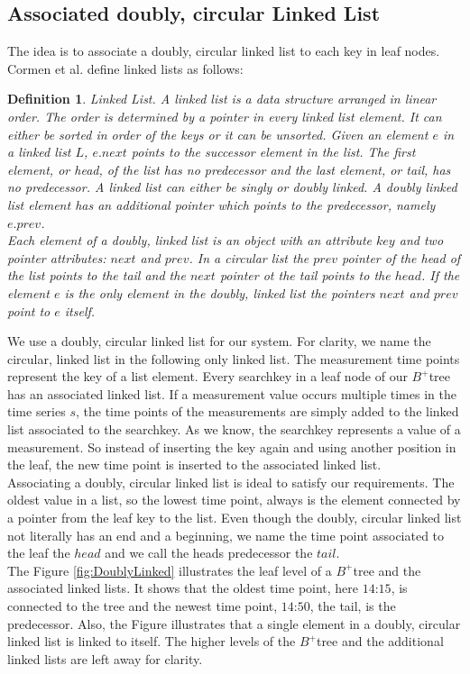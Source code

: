 \documentclass[abstracton,12pt]{scrreprt}
\newtheorem{definition}{Definition}
\begin{document}
\subsection{Associated doubly, circular Linked List}
\label{doublyLinked}
The idea is to associate a doubly, circular linked list to each key in leaf nodes. Cormen et al.\cite{LinkedListBook} define linked lists as follows: 
\begin{definition}
	Linked List. A linked list is a data structure arranged in linear order. The order is determined by a pointer in every linked list element. It can either be sorted in order of the keys or it can be unsorted. Given an element $e$ in a linked list $L$, $e.next$ points to the successor element in the list. The first element, or head, of the list has no predecessor and the last element, or tail, has no predecessor. A linked list can either be singly or doubly linked. A doubly linked list element has an additional pointer which points to the predecessor, namely $e.prev$.\\
	Each element of a doubly, linked list is an object with an attribute $key$ and two pointer attributes: $next$ and $prev$. In a circular list the $prev$ pointer of the head of the list points to the tail and the $next$ pointer ot the tail points to the $head$. If the element $e$ is the only element in the doubly, linked list the pointers $next$ and $prev$ point to $e$ itself. 
\end{definition}


We use a doubly, circular linked list for our system. For clarity, we name the circular, linked list in the following only linked list. The measurement time points represent the key of a list element. Every searchkey in a leaf node of our $B^+$tree has an associated linked list. If a measurement value occurs multiple times in the time series $s$, the time points of the measurements are simply added to the linked list associated to the searchkey. As we know, the searchkey represents a value of a measurement. So instead of inserting the key again and using another position in the leaf, the new time point is inserted to the associated linked list.\\ 
Associating a doubly, circular linked list is ideal to satisfy our requirements. The oldest value in a list, so the lowest time point, always is the element connected by a pointer from the leaf key to the list. Even though the doubly, circular linked list not literally has an end and a beginning, we name the time point associated to the leaf the $head$ and we call the heads predecessor the $tail$. \\The Figure \ref{fig:DoublyLinked} illustrates the leaf level of a $B^+$tree and the associated linked lists. It shows that the oldest time point, here $\text{14:15}$, is connected to the tree and the newest time point, $\text{14:50}$, the tail, is the predecessor. Also, the Figure illustrates that a single element in a doubly, circular linked list is linked to itself. The higher levels of the $B^+$tree and the additional linked lists are left away for clarity. 
\end{document}
